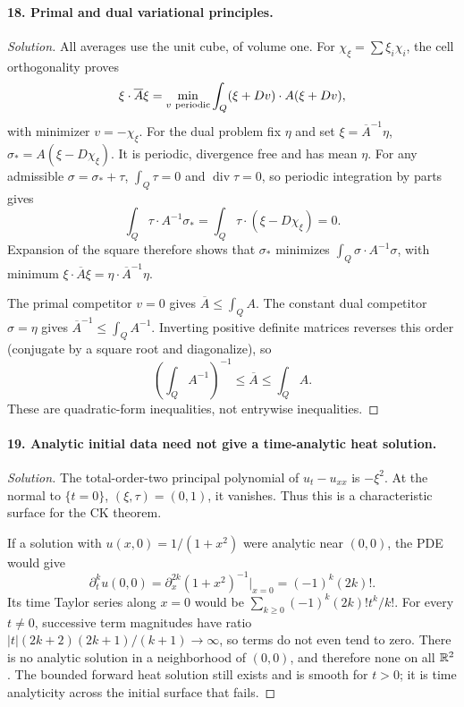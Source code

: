 \paragraph{18. Primal and dual variational principles.}
\begin{proof}[Solution]
All averages use the unit cube, of volume one.
For $\chi_\xi=\sum\xi_i\chi_i$, the cell orthogonality proves
\[
 \xi\cdot\overline A\xi
 =\min_{v\ {\rm periodic}}\int_Q(\xi+Dv)\cdot A(\xi+Dv),
\]
with minimizer $v=-\chi_\xi$.
For the dual problem fix $\eta$ and set
$\xi=\overline A^{-1}\eta$,
$\sigma_*=A(\xi-D\chi_\xi)$.
It is periodic, divergence free and has mean $\eta$.
For any admissible $\sigma=\sigma_*+\tau$, $\int_Q\tau=0$ and
$\operatorname{div}\tau=0$, so periodic integration by parts gives
\[
 \int_Q\tau\cdot A^{-1}\sigma_*
 =\int_Q\tau\cdot(\xi-D\chi_\xi)=0 .
\]
Expansion of the square therefore shows that $\sigma_*$ minimizes
$\int_Q\sigma\cdot A^{-1}\sigma$, with minimum
$\xi\cdot\overline A\xi=\eta\cdot\overline A^{-1}\eta$.

The primal competitor $v=0$ gives $\overline A\leq\int_QA$.
The constant dual competitor $\sigma=\eta$ gives
$\overline A^{-1}\leq\int_QA^{-1}$.
Inverting positive definite matrices reverses this order
(conjugate by a square root and diagonalize), so
\[
 \left(\int_QA^{-1}\right)^{-1}\leq\overline A\leq\int_QA .
\]
These are quadratic-form inequalities, not entrywise inequalities.
\end{proof}

\Needspace{30mm}
\paragraph{19. Analytic initial data need not give a time-analytic heat solution.}
\begin{proof}[Solution]
The total-order-two principal polynomial of $u_t-u_{xx}$ is $-\xi^2$.
At the normal to $\{t=0\}$, $(\xi,\tau)=(0,1)$, it vanishes.
Thus this is a characteristic surface for the CK theorem.

If a solution with $u(x,0)=1/(1+x^2)$ were analytic near $(0,0)$,
the PDE would give
\[
 \partial_t^ku(0,0)=\partial_x^{2k}(1+x^2)^{-1}|_{x=0}
                 =(-1)^k(2k)! .
\]
Its time Taylor series along $x=0$ would be
$\sum_{k\geq0}(-1)^k(2k)!t^k/k!$.
For every $t\ne0$, successive term magnitudes have ratio
$|t|(2k+2)(2k+1)/(k+1)\to\infty$, so terms do not even tend to zero.
There is no analytic solution in a neighborhood of $(0,0)$,
and therefore none on all $\mathbb{R}^2$.
The bounded forward heat solution still exists and is smooth for
$t>0$; it is time analyticity across the initial surface that fails.
\end{proof}
\Needspace{45mm}
